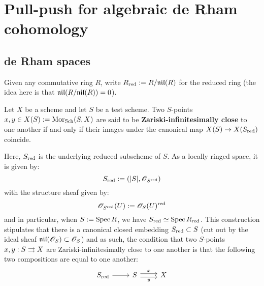     \section{Pull-push for algebraic de Rham cohomology}
        \subsection{de Rham spaces}
            \begin{convention}
                Given any commutative ring $R$, write $R_{\mathrm{red}} := R/\mathfrak{nil}(R)$ for the  reduced ring (the idea here is that $\mathfrak{nil}(R/\mathfrak{nil}(R)) = 0$).
            \end{convention}
        
            \begin{definition} \label{def: zariski_infinitesimally_close_points}
                Let $X$ be a scheme and let $S$ be a test scheme. Two $S$-points $x, y \in X(S) := \mathrm{Mor}_{\mathrm{Sch}}(S, X)$ are said to be \textbf{Zariski-infinitesimally close} to one another if and only if their images under the canonical map $X(S) \to X(S_{\mathrm{red}})$ coincide.
            \end{definition}
            Here, $S_{\mathrm{red}}$ is the underlying reduced subscheme of $S$. As a locally ringed space, it is given by:
                $$S_{\mathrm{red}} := (|S|, \mathscr{O}_{S^{\mathrm{red}}})$$
            with the structure sheaf given by:
                $$\mathscr{O}_{S^{\mathrm{red}}}(U) := \mathscr{O}_S(U)^{\mathrm{red}}$$
            and in particular, when $S := \operatorname{Spec} R$, we have $S_{\mathrm{red}} \simeq \operatorname{Spec} R_{\mathrm{red}}$. This construction stipulates that there is a canonical closed embedding $S_{\mathrm{red}} \subset S$ (cut out by the ideal sheaf $\mathfrak{nil}(\mathscr{O}_S) \subset \mathscr{O}_S$) and as such, the condition that two $S$-points $x, y: S \rightrightarrows X$ are Zariski-infinitesimally close to one another is that the following two compositions are equal to one another:
                $$
                    \begin{tikzcd}
                	{S_{\red}} & S & X
                	\arrow[from=1-1, to=1-2]
                	\arrow["y"', shift right, from=1-2, to=1-3]
                	\arrow["x", shift left, from=1-2, to=1-3]
                    \end{tikzcd}
                $$

